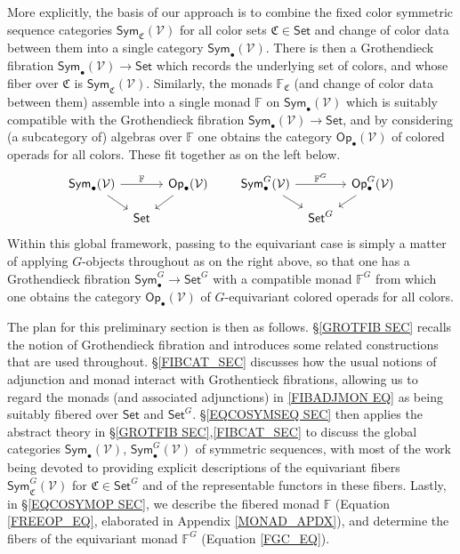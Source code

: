 \documentclass[a4paper,10pt
,draft
]{article}%
\numberwithin{equation}{section}
\numberwithin{figure}{section}
\theoremstyle{definition} %
\newcommand{\Sym}{\ensuremath{\mathsf{Sym}}}%
\newcommand{\Op}{\mathsf{Op}}%
\newcommand{\V}{\ensuremath{\mathcal V}}
\newcommand{\1}{\ensuremath{\mathbbm 1}}%
\begin{document}
More explicitly, the basis of our approach is to combine the 
fixed color symmetric sequence categories
$\mathsf{Sym}_{\mathfrak{C}}(\V)$ for all color sets 
$\mathfrak{C} \in \mathsf{Set}$
and change of color data between them into a single category
$\mathsf{Sym}_{\bullet}(\V)$.
There is then a Grothendieck fibration
$\mathsf{Sym}_{\bullet}(\V) \to \mathsf{Set}$
which records the underlying set of colors,
and whose fiber over $\mathfrak{C}$ is 
$\mathsf{Sym}_{\mathfrak{C}}(\V)$.
Similarly, the monads $\mathbb{F}_{\mathfrak{C}}$ (and change of color data between them) 
assemble into a single monad $\mathbb{F}$
on $\mathsf{Sym}_{\bullet}(\V)$
which is suitably compatible with 
the Grothendieck fibration 
$\mathsf{Sym}_{\bullet}(\V) \to \mathsf{Set}$,
and by considering (a subcategory of) algebras over $\mathbb{F}$
one obtains the category $\mathsf{Op}_{\bullet}(\V)$
of colored operads for all colors.
These fit together as on the left below.
\begin{equation}\label{FIBADJMON EQ}
\begin{tikzcd}[row sep = small, column sep = tiny]
\Sym_\bullet(\V) \arrow[rr, "\mathbb F"] \arrow[dr]
&&
\Op_\bullet(\V) \arrow[dl]
&&& %
\Sym^G_\bullet(\V) \arrow[rr, "\mathbb F^G"] \arrow[dr]
&&
\Op^G_\bullet(\V) \arrow[dl]
\\
&
\mathsf{Set}
&
&&& %
&
\mathsf{Set}^G
\end{tikzcd}
\end{equation}
Within this global framework, passing to the equivariant case is simply a matter of applying $G$-objects throughout as on the right above, 
so that one has a Grothendieck fibration
$\mathsf{Sym}_{\bullet}^G \to \mathsf{Set}^G$
with a compatible monad $\mathbb{F}^G$
from which one obtains the category 
$\mathsf{Op}_{\bullet}(\V)$
of $G$-equivariant colored operads for all colors. 


The plan for this preliminary section is then as follows.
%
\S \ref{GROTFIB SEC} recalls the notion of Grothendieck fibration and
introduces some related constructions that are used throughout.
%
\S \ref{FIBCAT_SEC} discusses how the usual notions of adjunction and monad interact with Grothentieck fibrations,
allowing us to regard the monads
(and associated adjunctions)
in \eqref{FIBADJMON EQ}
as being suitably fibered over $\mathsf{Set}$ and $\mathsf{Set}^G$.
%
\S \ref{EQCOSYMSEQ SEC} then applies the abstract theory in 
\S \ref{GROTFIB SEC},\ref{FIBCAT_SEC}
to discuss the global categories
$\mathsf{Sym}_{\bullet}(\V)$,
$\mathsf{Sym}^G_{\bullet}(\V)$
of symmetric sequences, 
with most of the work being devoted to providing 
explicit descriptions of the equivariant fibers
$\mathsf{Sym}^G_{\mathfrak{C}}(\V)$
for $\mathfrak{C} \in \mathsf{Set}^G$
and of the representable functors in these fibers.
%
Lastly, in \S \ref{EQCOSYMOP SEC}, 
we describe the fibered monad $\mathbb F$ (Equation \eqref{FREEOP_EQ}, elaborated in Appendix \ref{MONAD_APDX}),
and determine the fibers of the equivariant monad $\mathbb F^G$ (Equation \eqref{FGC_EQ}).
\end{document}
